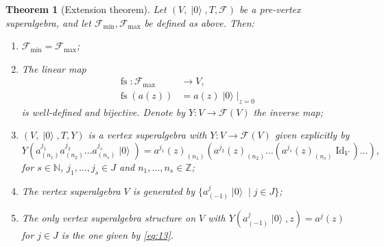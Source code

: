 \documentclass[a4paper, 12pt, reqno]{amsart}
\newtheorem{theorem}{Theorem}[section]
\theoremstyle{remark}
\numberwithin{equation}{subsection}
\DeclareMathOperator{\Id}{Id}
\DeclareMathOperator{\vac}{|0\rangle}
\DeclareMathOperator{\fs}{fs}
\begin{document}
\begin{theorem}[Extension theorem]
  \label{thr:18}
  Let $(V, \vac, T, \mathcal{F})$ be a pre-vertex superalgebra, and let $\mathcal{F}_{\min}, \mathcal{F}_{\max}$ be defined as above.
  Then:
  \begin{enumerate}
  \item $\mathcal{F}_{\min} = \mathcal{F}_{\max}$;
  \item The linear map
    \begin{align*}
      \fs: \mathcal{F}_{\max} &\to V, \\
      \fs(a(z)) &= a(z)\vac|_{z = 0}
    \end{align*}
    is well-defined and bijective.
    Denote by $Y: V \to \mathcal{F}(V)$ the inverse map;
  \item $(V, \vac, T, Y)$ is a vertex superalgebra with $Y: V \to \mathcal{F}(V)$ given explicitly by
    \begin{equation}
      \label{eq:13}
      Y(a^{j_1}_{(n_1)}a^{j_2}_{(n_2)}\dots a^{j_s}_{(n_s)}\vac) = a^{j_1}(z)_{(n_1)}(a^{j_2}(z)_{(n_2)}\dots (a^{j_s}(z)_{(n_s)}\Id_V)\dots),
    \end{equation}
    for $s \in \mathbb{N}$, $j_1, \dots, j_s \in J$ and $n_1, \dots, n_s \in \mathbb{Z}$;
  \item The vertex superalgebra $V$ is generated by $\{a^j_{(-1)}\vac \mid j \in J\}$;
  \item The only vertex superalgebra structure on $V$ with $Y(a^j_{(-1)}\vac, z) = a^j(z)$ for $j \in J$ is the one given by \eqref{eq:13}.
  \end{enumerate}
\end{theorem}
\end{document}
